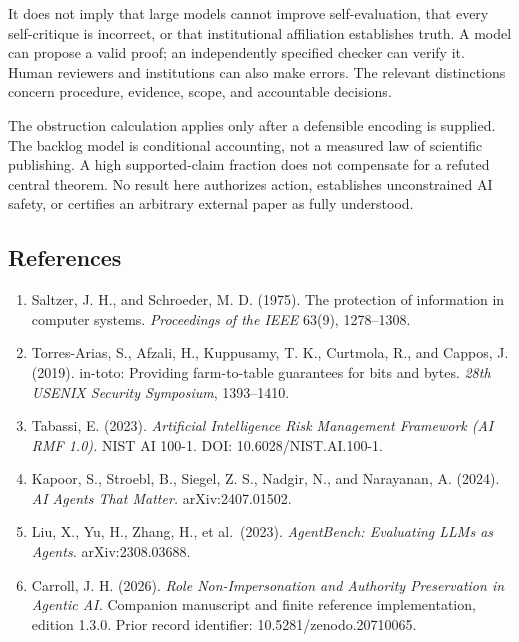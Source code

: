 \documentclass[
  10pt,
]{article}
\begin{document}
It does not imply that large models cannot improve self-evaluation, that every self-critique is incorrect, or that institutional affiliation establishes truth. A model can propose a valid proof; an independently specified checker can verify it. Human reviewers and institutions can also make errors. The relevant distinctions concern procedure, evidence, scope, and accountable decisions.

The obstruction calculation applies only after a defensible encoding is supplied. The backlog model is conditional accounting, not a measured law of scientific publishing. A high supported-claim fraction does not compensate for a refuted central theorem. No result here authorizes action, establishes unconstrained AI safety, or certifies an arbitrary external paper as fully understood.

\subsection{References}\label{references}

\begin{enumerate}
\def\labelenumi{\arabic{enumi}.}
\item
  Saltzer, J. H., and Schroeder, M. D. (1975). The protection of information in computer systems. \emph{Proceedings of the IEEE} 63(9), 1278--1308.
\item
  Torres-Arias, S., Afzali, H., Kuppusamy, T. K., Curtmola, R., and Cappos, J. (2019). in-toto: Providing farm-to-table guarantees for bits and bytes. \emph{28th USENIX Security Symposium}, 1393--1410.
\item
  Tabassi, E. (2023). \emph{Artificial Intelligence Risk Management Framework (AI RMF 1.0).} NIST AI 100-1. DOI: 10.6028/NIST.AI.100-1.
\item
  Kapoor, S., Stroebl, B., Siegel, Z. S., Nadgir, N., and Narayanan, A. (2024). \emph{AI Agents That Matter.} arXiv:2407.01502.
\item
  Liu, X., Yu, H., Zhang, H., et al.~(2023). \emph{AgentBench: Evaluating LLMs as Agents.} arXiv:2308.03688.
\item
  Carroll, J. H. (2026). \emph{Role Non-Impersonation and Authority Preservation in Agentic AI.} Companion manuscript and finite reference implementation, edition 1.3.0. Prior record identifier: 10.5281/zenodo.20710065.
\end{enumerate}
\end{document}

